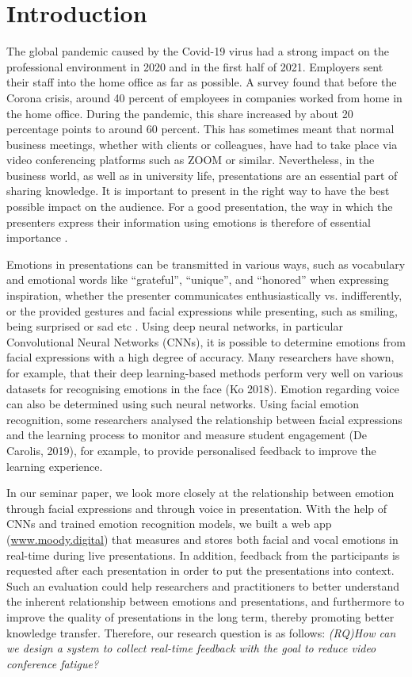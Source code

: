 \section{Introduction}
\label{sec:intro}
The global pandemic caused by the Covid-19 virus had a strong impact on the professional environment in 2020 and in the first half of 2021. Employers sent their staff into the home office as far as possible. A survey found that before the Corona crisis, around 40 percent of employees in companies worked from home in the home office. During the pandemic, this share increased by about 20 percentage points to around 60 percent. This has sometimes meant that normal business meetings, whether with clients or colleagues, have had to take place via video conferencing platforms such as ZOOM or similar. Nevertheless, in the business world, as well as in university life, presentations are an essential part of sharing knowledge. It is important to present in the right way to have the best possible impact on the audience. For a good presentation, the way in which the presenters express their information using emotions is therefore of essential importance \cite{derrico_tracking_2019}.

Emotions in presentations can be transmitted in various ways, such as vocabulary and emotional words like “grateful”, “unique”, and “honored” when expressing inspiration, whether the presenter communicates enthusiastically vs. indifferently, or the provided gestures and facial expressions while presenting, such as smiling, being surprised or sad etc \cite{zeng_emoco_2019, rosler_reducing_2021}. Using deep neural networks, in particular Convolutional Neural Networks (CNNs), it is possible to determine emotions from facial expressions with a high degree of accuracy. Many researchers have shown, for example, that their deep learning-based methods perform very well on various datasets for recognising emotions in the face \cite{ko_brief_2018} (Ko 2018). Emotion regarding voice can also be determined using such neural networks. Using facial emotion recognition, some researchers analysed the relationship between facial expressions and the learning process to monitor and measure student engagement (De Carolis, 2019), for example, to provide personalised feedback to improve the learning experience. 

In our seminar paper, we look more closely at the relationship between emotion through facial expressions and through voice in presentation. With the help of CNNs and trained emotion recognition models, we built a web app (\url{www.moody.digital}) that measures and stores both facial and vocal emotions in real-time during live presentations. In addition, feedback from the participants is requested after each presentation in order to put the presentations into context. Such an evaluation could help researchers and practitioners to better understand the inherent relationship between emotions and presentations, and furthermore to improve the quality of presentations in the long term, thereby promoting better knowledge transfer. Therefore, our research question is as follows:
\vspace{3mm}
\newline
\emph{(RQ)\quad How can we design a system to collect real-time feedback with the goal to reduce video conference fatigue?}

